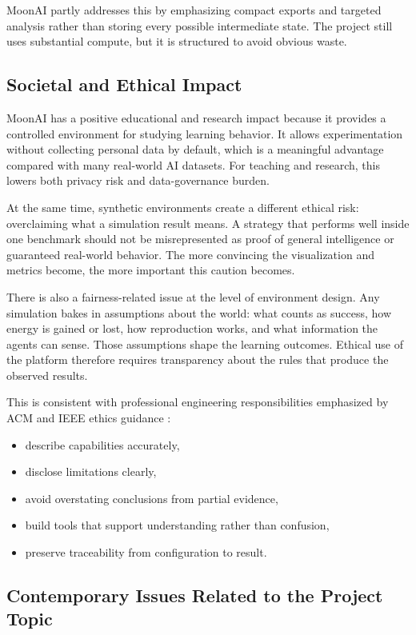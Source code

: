 MoonAI partly addresses this by emphasizing compact exports and targeted analysis rather than
storing every possible intermediate state. The project still uses substantial compute, but it is
structured to avoid obvious waste.

\subsection{Societal and Ethical Impact}

MoonAI has a positive educational and research impact because it provides a controlled
environment for studying learning behavior. It allows experimentation without collecting
personal data by default, which is a meaningful advantage compared with many real-world AI
datasets. For teaching and research, this lowers both privacy risk and data-governance burden.

At the same time, synthetic environments create a different ethical risk: overclaiming what a
simulation result means. A strategy that performs well inside one benchmark should not be
misrepresented as proof of general intelligence or guaranteed real-world behavior. The more
convincing the visualization and metrics become, the more important this caution becomes.

There is also a fairness-related issue at the level of environment design. Any simulation bakes
in assumptions about the world: what counts as success, how energy is gained or lost, how
reproduction works, and what information the agents can sense. Those assumptions shape the
learning outcomes. Ethical use of the platform therefore requires transparency about the rules
that produce the observed results.

This is consistent with professional engineering responsibilities emphasized by ACM and IEEE
ethics guidance \cite{acm,ieeeethics}:

\begin{itemize}[nosep]
  \item describe capabilities accurately,
  \item disclose limitations clearly,
  \item avoid overstating conclusions from partial evidence,
  \item build tools that support understanding rather than confusion,
  \item preserve traceability from configuration to result.
\end{itemize}

\subsection{Contemporary Issues Related to the Project Topic}


